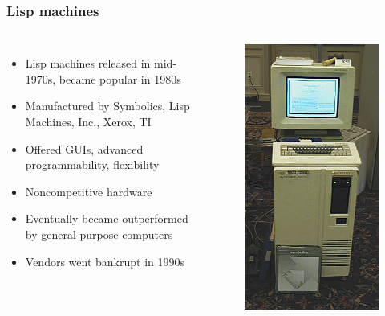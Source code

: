\documentclass{beamer}
\begin{document}
\begin{frame}
	\frametitle{Lisp machines}
	\begin{columns}[c] %
		
		\begin{itemize}
			\item Lisp machines released in mid-1970s, became popular in 1980s
			\item Manufactured by Symbolics, Lisp Machines, Inc., Xerox, TI
			\item Offered GUIs, advanced programmability, flexibility
			\item Noncompetitive hardware
			\item Eventually became outperformed by general-purpose computers
			\item Vendors went bankrupt in 1990s
		\end{itemize}
		
		\begin{figure}
		\includegraphics[width=0.6\linewidth]{../img/Symbolics3640}
		\end{figure}
		
	\end{columns}
\end{frame}
\end{document}
